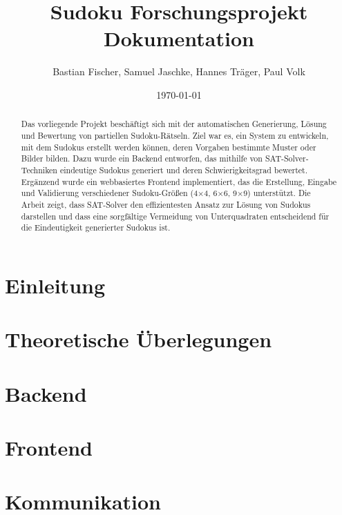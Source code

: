 \documentclass[12pt,a4paper]{article}
\title{Sudoku Forschungsprojekt Dokumentation}
\author{Bastian Fischer, Samuel Jaschke, Hannes Träger, Paul Volk}
\date{\today}
\begin{document}
\maketitle

\begin{abstract}
    Das vorliegende Projekt beschäftigt sich mit der automatischen Generierung, Lösung und Bewertung von partiellen Sudoku-Rätseln.
    Ziel war es, ein System zu entwickeln, mit dem Sudokus erstellt werden können, deren Vorgaben bestimmte Muster oder Bilder bilden.
    Dazu wurde ein Backend entworfen, das mithilfe von SAT-Solver-Techniken eindeutige Sudokus generiert und deren Schwierigkeitsgrad bewertet.
    Ergänzend wurde ein webbasiertes Frontend implementiert, das die Erstellung, Eingabe und Validierung verschiedener Sudoku-Größen (4×4, 6×6, 9×9) unterstützt.
    Die Arbeit zeigt, dass SAT-Solver den effizientesten Ansatz zur Lösung von Sudokus darstellen und
    dass eine sorgfältige Vermeidung von Unterquadraten entscheidend für die Eindeutigkeit generierter Sudokus ist.
\end{abstract}

\section{Einleitung}




\section{Theoretische Überlegungen}
\label{sec:theoretische_ueberlegungen}



\section{Backend}
\label{sec:backend}


\section{Frontend}
\label{sec:frontend}


\section{Kommunikation}
\label{sec:kommunikation}

\end{document}
